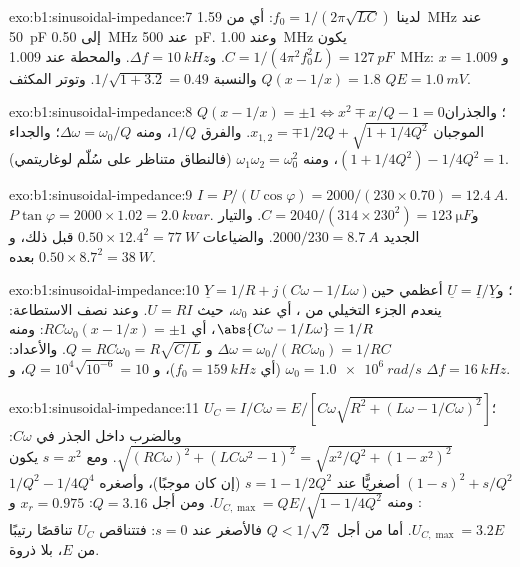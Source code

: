 \begin{solution}{exo:b1:sinusoidal-impedance:7}
لدينا $f_0 = 1/(2\pi\sqrt{LC})$: أي من \qty{1.59}{MHz} عند \qty{50}{pF}
إلى \qty{0.50}{MHz} عند \qty{500}{pF}. وعند \qty{1.00}{MHz} يكون
$C = 1/(4\pi^2f_0^2L) = \qty{127}{pF}$.
و$\Delta f = \qty{10}{kHz}$. والمحطة عند \qty{1.009}{MHz}: $x = 1.009$ و
$Q(x - 1/x) = 1.8$ والنسبة $1/\sqrt{1 + 3.2} = 0.49$. وتوتر المكثف
$QE = \qty{1.0}{mV}$.
\end{solution}

\begin{solution}{exo:b1:sinusoidal-impedance:8}
$Q(x - 1/x) = \pm1 \Leftrightarrow x^2 \mp x/Q - 1 = 0$؛ والجذران الموجبان
$x_{1,2} = \mp 1/2Q + \sqrt{1 + 1/4Q^2}$. والفرق $1/Q$، ومنه
$\Delta\omega = \omega_0/Q$؛ والجداء $(1 + 1/4Q^2) - 1/4Q^2 = 1$، ومنه
$\omega_1\omega_2 = \omega_0^2$ (فالنطاق متناظر على سُلّم لوغاريتمي).
\end{solution}

\begin{solution}{exo:b1:sinusoidal-impedance:9}
$I = P/(U\cos\varphi) = 2000/(230 \times 0.70) = \qty{12.4}{A}$.  $P\tan\varphi = 2000 \times 1.02 = \qty{2.0}{kvar}$. و$C = 2040/(314
\times 230^2) = \qty{123}{\micro F}$. والتيار الجديد $2000/230 = \qty{8.7}{A}$.
والضياعات $0.50 \times 12.4^2 = \qty{77}{W}$ قبل ذلك، و$0.50 \times 8.7^2 =
\qty{38}{W}$ بعده.
\end{solution}

\begin{solution}{exo:b1:sinusoidal-impedance:10}
$\underline Y = 1/R + j(C\omega - 1/L\omega)$؛ و$\underline U = \underline I/
\underline Y$ أعظمي حين ينعدم الجزء التخيلي من ، أي عند $\omega_0$،
حيث $U = RI$. وعند نصف الاستطاعة: $\abs{C\omega - 1/L\omega} = 1/R$، أي
$RC\omega_0(x - 1/x) = \pm1$: ومنه $\Delta\omega = \omega_0/(RC\omega_0) = 1/RC$
و $Q = RC\omega_0 = R\sqrt{C/L}$. والأعداد: $\omega_0 = \qty{1.0e6}{rad/s}$
(أي $f_0 = \qty{159}{kHz}$)، و $Q = 10^4\sqrt{10^{-6}} = 10$، و $\Delta f =
\qty{16}{kHz}$.
\end{solution}

\begin{solution}{exo:b1:sinusoidal-impedance:11}
$U_C = I/C\omega = E/[C\omega\sqrt{R^2 + (L\omega - 1/C\omega)^2}]$؛
وبالضرب داخل الجذر في $C\omega$: $\sqrt{(RC\omega)^2 + (LC\omega^2 - 1)^2} =
\sqrt{x^2/Q^2 + (1 - x^2)^2}$. ومع $s = x^2$ يكون $(1 - s)^2 + s/Q^2$
أصغريًّا عند $s = 1 - 1/2Q^2$ (إن كان موجبًا)، وأصغره $1/Q^2 - 1/4Q^4$:
ومنه $U_{C,\max} = QE/\sqrt{1 - 1/4Q^2}$. ومن أجل $Q = 3.16$: $x_r = 0.975$ و
$U_{C,\max} = 3.2E$. أما من أجل $Q < 1/\sqrt2$ فالأصغر عند $s = 0$: فتتناقص $U_C$
تناقصًا رتيبًا من $E$، بلا ذروة.
\end{solution}

